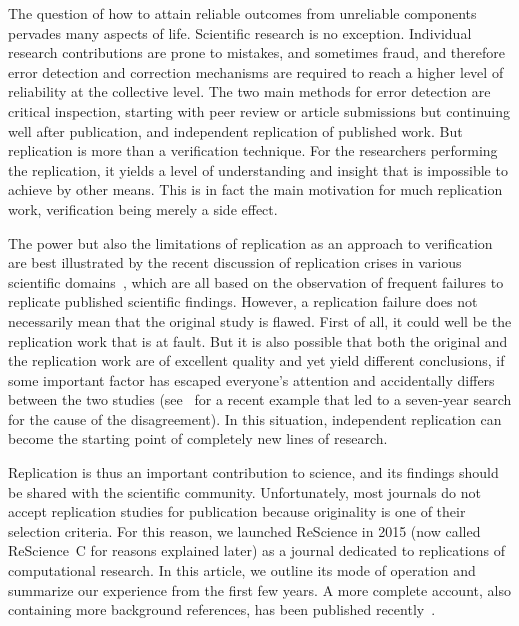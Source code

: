 \documentclass[runningheads]{llncs}
\begin{document}
The question of how to attain reliable outcomes from unreliable components pervades many aspects of life. Scientific research is no exception. Individual research contributions are prone to mistakes, and sometimes fraud, and therefore error detection and correction mechanisms are required to reach a higher level of reliability at the collective level. The two main methods for error detection are critical inspection, starting with peer review or article submissions but continuing well after publication, and independent replication of published work. But replication is more than a verification technique. For the researchers performing the replication, it yields a level of understanding and insight that is impossible to achieve by other means. This is in fact the main motivation for much replication work, verification being merely a side effect.

The power but also the limitations of replication as an approach to verification are best illustrated by the recent discussion of replication crises in various scientific domains~\cite{IoannidisWhyMostPublished2005,Baker500scientistslift2016,Munafomanifestoreproduciblescience2017,IqbalReproducibleResearchPractices2016}, which are all based on the observation of frequent failures to replicate published scientific findings. However, a replication failure does not necessarily mean that the original study is flawed. First of all, it could well be the replication work that is at fault. But it is also possible that both the original and the replication work are of excellent quality and yet yield different conclusions, if some important factor has escaped everyone's attention and accidentally differs between the two studies (see~\cite{Smartwarsupercooledwater2018,PalmerCommentputativeliquidliquid2018} for a recent example that led to a seven-year search for the cause of the disagreement). In this situation, independent replication can become the starting point of completely new lines of research.

Replication is thus an important contribution to science, and its findings should be shared with the scientific community. Unfortunately, most journals do not accept replication studies for publication because originality is one of their selection criteria. For this reason, we launched ReScience in 2015 (now called ReScience~C for reasons explained later) as a journal dedicated to replications of computational research. In this article, we outline its mode of operation and summarize our experience from the first few years. A more complete account, also containing more background references, has been published recently~\cite{RougierSustainablecomputationalscience2017}.
\end{document}

